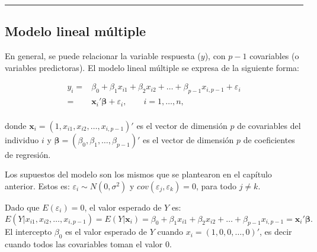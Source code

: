 \documentclass[
]{article}
\begin{document}
\rule{\textwidth}{0.4pt}

\hypertarget{modelo-lineal-muxfaltiple-1}{%
\subsection{Modelo lineal múltiple}\label{modelo-lineal-muxfaltiple-1}}

En general, se puede relacionar la variable respuesta (\(y\)), con \(p-1\) covariables (o variables predictoras). El modelo lineal múltiple se expresa de la siguiente forma:

\begin{equation}
\begin{split}
y_{i} =& \beta_{0} + \beta_{1}x_{i1} + \beta_{2}x_{i2} + \ldots + \beta_{p-1} x_{i,p-1} + \varepsilon_{i} \\
=& \boldsymbol x_{i}'\boldsymbol \beta+ \varepsilon_{i}, \qquad i=1,\ldots,n, \\
\end{split}
\label{eq:modMultiple}
\end{equation}

donde \(\boldsymbol x_{i} = (1,x_{i1},x_{i2},\ldots,x_{i,p-1})'\) es el vector de dimensión \(p\) de covariables del individuo \(i\) y \(\boldsymbol \beta= (\beta_{0},\beta_{1},\ldots,\beta_{p-1})'\) es el vector de dimensión \(p\) de coeficientes de regresión.

Los supuestos del modelo son los mismos que se plantearon en el capítulo anterior. Estos es: \(\varepsilon_{i} \sim N\left(0,\sigma^{2} \right)\) y \(cov(\varepsilon_{j},\varepsilon_{k})=0\), para todo \(j \neq k\).

Dado que \(E(\varepsilon_{i})=0\), el valor esperado de \(Y\) es:
\begin{equation}
E(Y| x_{i1},x_{i2},\ldots,x_{i,p-1}) = E(Y| \boldsymbol x_{i}) = \beta_{0} + \beta_{1}x_{i1} + \beta_{2}x_{i2} + \ldots + \beta_{p-1} x_{i,p-1} = \boldsymbol x_{i}'\boldsymbol \beta.
\label{eq:expValue}
\end{equation}
El intercepto \(\beta_{0}\) es el valor esperado de \(Y\) cuando \(x_{i}=(1,0,0,\ldots,0)'\), es decir cuando todos las covariables toman el valor \(0\).
\end{document}

